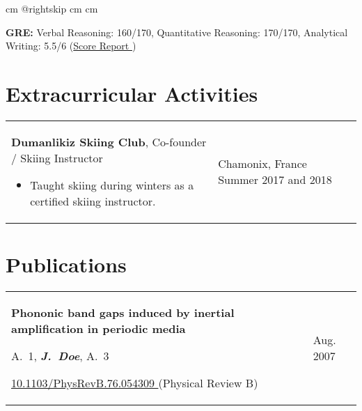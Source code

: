 \documentclass[10pt, a4paper]{article}
\newenvironment{highlights}{
        \begin{itemize}[
                topsep=0pt,
                parsep=0.10 cm,
                partopsep=0pt,
                itemsep=0pt,
                after=\vspace{-1\baselineskip},
                leftmargin=0.4 cm + 3pt
            ]
    }{
        \end{itemize}
    } %
\let\hrefWithoutArrow\href
\renewcommand{\href}[2]{\hrefWithoutArrow{#1}{#2 \raisebox{.15ex}{\footnotesize \faExternalLink*}}}
\begin{document}
            \par\endgroup

        \vspace{0.2 cm}
            \begingroup    {} cm
            \advance\csname @rightskip cm
            \advance{} cm

            \textbf{GRE:} Verbal Reasoning: 160/170, Quantitative Reasoning: 170/170, Analytical Writing: 5.5/6 (\href{https://example.com/}{Score Report})

            \par\endgroup



    \section{Extracurricular Activities}
    
        \begin{tabularx}{ cm-0.13cm}{K{0.2 cm} R{3.6 cm}}
            \textbf{Dumanlikiz Skiing Club}, Co-founder / Skiing Instructor
            \vspace{0.10 cm}
            \begin{highlights}
                \item Taught skiing during winters as a certified skiing instructor. \hspace*{-0.2cm}
            \end{highlights}
        &
            Chamonix, France \newline
            Summer 2017 and 2018
        \end{tabularx}



    \section{Publications}
    
        \begin{tabularx}{ cm-0.13cm}{K{0.2 cm} R{3.6 cm}}
            \textbf{Phononic band gaps induced by inertial amplification in periodic media}

            \vspace{0.10 cm}

            \mbox{A. 1}, \mbox{\textbf{\textit{J. Doe}}}, \mbox{A. 3}

            \vspace{0.10 cm}

            \href{https://doi.org/10.1103/PhysRevB.76.054309}{10.1103/PhysRevB.76.054309} (Physical Review B)
            &
            Aug. 2007

        \end{tabularx}
\end{document}

